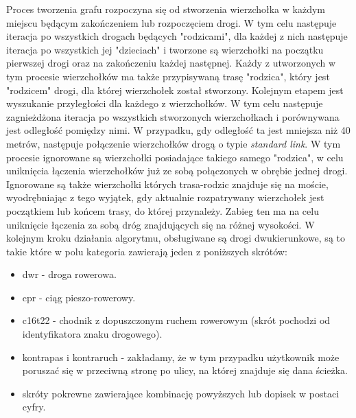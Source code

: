 Proces tworzenia grafu rozpoczyna się od stworzenia wierzchołka w każdym miejscu będącym zakończeniem lub rozpoczęciem drogi. W tym celu następuje iteracja po wszystkich drogach będących "rodzicami", dla każdej z nich następuje iteracja po wszystkich jej "dzieciach" i tworzone są wierzchołki na początku pierwszej drogi oraz na zakończeniu każdej następnej. Każdy z utworzonych w tym procesie wierzchołków ma także przypisywaną trasę "rodzica", który jest "rodzicem" drogi, dla której wierzchołek został stworzony. Kolejnym etapem jest wyszukanie przyległości dla każdego z wierzchołków. W tym celu następuje zagnieżdżona iteracja po wszystkich stworzonych wierzchołkach i porównywana jest odległość pomiędzy nimi. W przypadku, gdy odległość ta jest mniejsza niż 40 metrów, następuje połączenie wierzchołków drogą o typie \textit{standard link}. W tym procesie ignorowane są wierzchołki posiadające takiego samego "rodzica", w celu uniknięcia łączenia wierzchołków już ze sobą połączonych w obrębie jednej drogi. Ignorowane są także wierzchołki których trasa-rodzic znajduje się na moście, wyodrębniając z tego wyjątek, gdy aktualnie rozpatrywany wierzchołek jest początkiem lub końcem trasy, do której przynależy. Zabieg ten ma na celu uniknięcie łączenia za sobą dróg znajdujących się na różnej wysokości.
W kolejnym kroku działania algorytmu, obsługiwane są drogi dwukierunkowe, są to takie które w polu kategoria zawierają jeden z poniższych skrótów:

\begin{itemize}
\item dwr - droga rowerowa.
\item cpr - ciąg pieszo-rowerowy.
\item c16t22 - chodnik z dopuszczonym ruchem rowerowym (skrót pochodzi od identyfikatora znaku drogowego).
\item kontrapas i kontraruch - zakładamy, że w tym przypadku użytkownik może poruszać się w przeciwną stronę po ulicy, na której znajduje się dana ścieżka.
\item skróty pokrewne zawierające kombinację powyższych lub dopisek w postaci cyfry.
\end{itemize}

